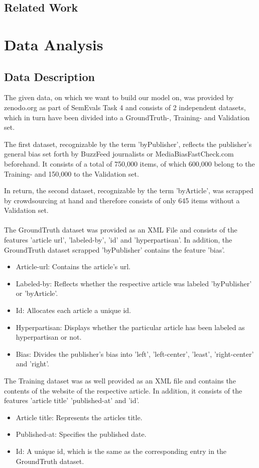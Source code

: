 \documentclass[11pt,titlepage,oneside,openany]{book}
\begin{document}
\section{Related Work}


\chapter{Data Analysis}
\label{cha:theory}


\section{Data Description}
 The given data, on which we want to build our model on, was provided by zenodo.org as part of SemEvals Task 4 and consists of 2 independent datasets, which in turn have been divided into a GroundTruth-, Training- and Validation set.
 
 \noindent The first dataset, recognizable by the term 'byPublisher', reflects the publisher's general bias set forth by BuzzFeed journalists or MediaBiasFastCheck.com beforehand. It consists of a total of 750,000 items, of which 600,000 belong to the Training- and 150,000 to the Validation set.
 
 \noindent In return, the second dataset, recognizable by the term 'byArticle', was scrapped by crowdsourcing at hand and therefore consists of only 645 items without a Validation set.\\
 \\
 The GroundTruth dataset was provided as an XML File and consists of the features 'article url', 'labeled-by', 'id' and 'hyperpartisan'. In addition, the GroundTruth dataset scrapped 'byPublisher' contains the feature 'bias'.
\begin{itemize}
	\item Article-url: Contains the article's url.
	\item Labeled-by: Reflects whether the respective article was labeled 'byPublisher' or 'byArticle'.
	\item Id: Allocates each article a unique id.
	\item Hyperpartisan: Displays whether the particular article has been labeled as hyperpartisan or not.
	\item Bias: Divides the publisher's bias into 'left', 'left-center', 'least', 'right-center' and 'right'.
\end{itemize}
 The Training dataset was as well provided as an XML file and contains the contents of the website of the respective article. In addition, it consists of the features 'article title' 'published-at' and 'id'.
\begin{itemize}
	\item Article title: Represents the articles title.
	\item Published-at: Specifies the published date.
	\item Id: A unique id, which is the same as the corresponding entry in the GroundTruth dataset.
\end{itemize}
\end{document}
